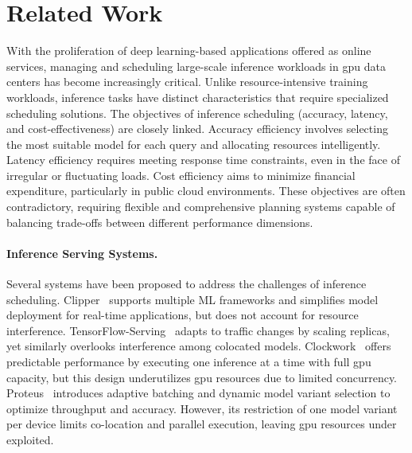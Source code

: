 \section{Related Work}\label{sec:related}

With the proliferation of deep learning-based applications offered as online services, managing and scheduling large-scale inference workloads in \gls{gpu} data centers has become increasingly critical. Unlike resource-intensive training workloads, inference tasks have distinct characteristics that require specialized scheduling solutions. The objectives of inference scheduling (accuracy, latency, and cost-effectiveness) are closely linked. Accuracy efficiency involves selecting the most suitable model for each query and allocating resources intelligently. Latency efficiency requires meeting response time constraints, even in the face of irregular or fluctuating loads. Cost efficiency aims to minimize financial expenditure, particularly in public cloud environments. These objectives are often contradictory, requiring flexible and comprehensive planning systems capable of balancing trade-offs between different performance dimensions.

\paragraph{Inference Serving Systems.}
Several systems have been proposed to address the challenges of inference scheduling. Clipper~\cite{2017Clipper} supports multiple ML frameworks and simplifies model deployment for real-time applications, but does not account for resource interference. TensorFlow-Serving~\cite{olston2017tensorflowserving} adapts to traffic changes by scaling replicas, yet similarly overlooks interference among colocated models. Clockwork~\cite{gujarati2020servingdnnslikeclockwork} offers predictable performance by executing one inference at a time with full \acrshort{gpu} capacity, but this design underutilizes \acrshort{gpu} resources due to limited concurrency. Proteus~\cite{ahmad2024proteus} introduces adaptive batching and dynamic model variant selection to optimize throughput and accuracy. However, its restriction of one model variant per device limits co-location and parallel execution, leaving \acrshort{gpu} resources under exploited.

